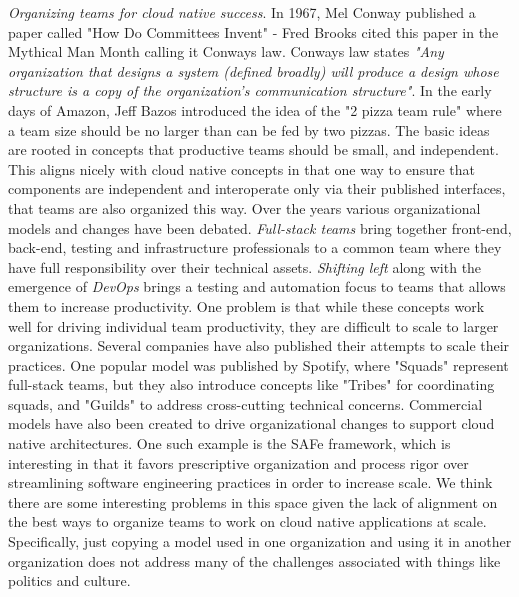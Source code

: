 \documentclass[conference]{IEEEconf}
\begin{document}
\textit{Organizing teams for cloud native success}.  In 1967, Mel Conway published a paper called "How Do Committees Invent" - Fred Brooks cited this paper in the Mythical Man Month\cite{Brooks1975} calling it Conways law\cite{ConwaysLaw}. Conways law states \textit{"Any organization that designs a system (defined broadly) will produce a design whose structure is a copy of the organization's communication structure"}.  In the early days of Amazon, Jeff Bazos introduced the idea of the "2 pizza team rule"\cite{TwoPizza} where a team size should be no larger than can be fed by two pizzas.  The basic ideas are rooted in concepts that productive teams should be small, and independent.  This aligns nicely with cloud native concepts in that one way to ensure that components are independent and interoperate only via their published interfaces, that teams are also organized this way.  Over the years various organizational models and changes have been debated. \textit{Full-stack teams} bring together front-end, back-end, testing and infrastructure professionals to a common team where they have full responsibility over their technical assets. \textit{Shifting left} along with the emergence of \textit{DevOps} brings a testing and automation focus to teams that allows them to increase productivity.  One problem is that while these concepts work well for driving individual team productivity, they are difficult to scale to larger organizations.  Several companies have also published their attempts to scale their practices.  One popular model was published by Spotify\cite{SpotifyModel}, where "Squads" represent full-stack teams, but they also introduce concepts like "Tribes" for coordinating squads, and "Guilds" to address cross-cutting technical concerns. Commercial models have also been created to drive organizational changes to support cloud native architectures.  One such example is the SAFe\cite{SAFeAgile} framework, which is interesting in that it favors prescriptive organization and process rigor over streamlining software engineering practices in order to increase scale. We think there are some interesting problems in this space given the lack of alignment on the best ways to organize teams to work on cloud native applications at scale. Specifically, just copying a model used in one organization and using it in another organization does not address many of the challenges associated with things like politics and culture. 
\end{document}
